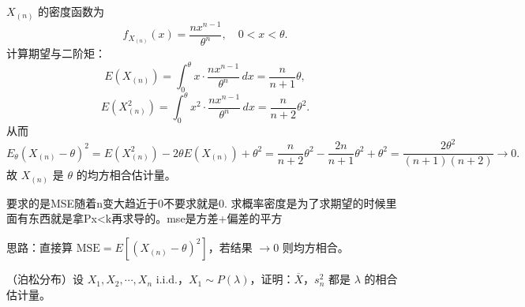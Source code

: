 \begin{solution}
$X_{(n)}$ 的密度函数为
\[
f_{X_{(n)}}(x) = \frac{n x^{n-1}}{\theta^n}, \quad 0 < x < \theta.
\]
计算期望与二阶矩：
\[
E(X_{(n)}) = \int_0^\theta x \cdot \frac{n x^{n-1}}{\theta^n} \, dx = \frac{n}{n+1}\theta,
\]
\[
E(X_{(n)}^2) = \int_0^\theta x^2 \cdot \frac{n x^{n-1}}{\theta^n} \, dx = \frac{n}{n+2}\theta^2.
\]
从而
\[
E_\theta(X_{(n)} - \theta)^2 = E(X_{(n)}^2) - 2\theta E(X_{(n)}) + \theta^2
= \frac{n}{n+2}\theta^2 - \frac{2n}{n+1}\theta^2 + \theta^2
= \frac{2\theta^2}{(n+1)(n+2)} \to 0.
\]
故 $X_{(n)}$ 是 $\theta$ 的均方相合估计量。
\end{solution}
\begin{dxtips}
    要求的是MSE随着n变大趋近于0不要求就是0.
    求概率密度是为了求期望的时候里面有东西就是拿Px<k再求导的。mse是方差+偏差的平方
\end{dxtips}
\begin{dxtips}
    思路：直接算 $\mathrm{MSE} = E[(X_{(n)} - \theta)^2]$，若结果 $\to 0$ 则均方相合。
\end{dxtips}
\begin{homework}[4]
（泊松分布）设 $X_1, X_2, \cdots, X_n$ i.i.d.，$X_1 \sim P(\lambda)$，证明：$\overline{X}$，$s_n^2$ 都是 $\lambda$ 的相合估计量。
\end{homework}

